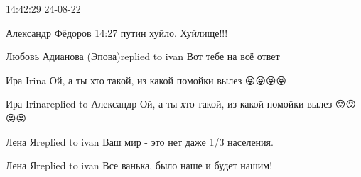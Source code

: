  
 
 
 
 

14:42:29 24-08-22

Александр Фёдоров
14:27
путин хуйло. Хуйлище!!!

Любовь Адианова (Эпова)replied to ivan
Вот тебе на всё ответ

Ира Irina
Ой, а ты хто такой, из какой помойки вылез 😝😝😝😝

Ира Irinareplied to Александр
Ой, а ты хто такой, из какой помойки вылез 😝😝😝😝

Лена Яreplied to ivan
Ваш мир - это нет даже 1/3 населения.

Лена Яreplied to ivan
Все ванька, было наше и будет нашим!
